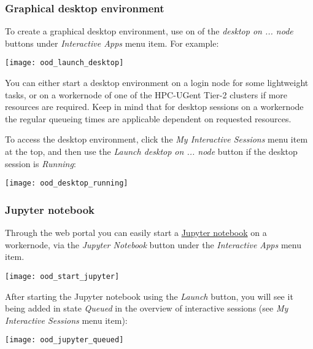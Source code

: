 \subsubsection{Graphical desktop environment}

To create a graphical desktop environment, use on of the \emph{desktop on ... node} buttons under \emph{Interactive Apps} menu item. For example:

\begin{center}
    \texttt{[image: ood\_launch\_desktop]}
\end{center}

You can either start a desktop environment on a login node
for some lightweight tasks, or on a workernode of one of the HPC-UGent Tier-2 clusters if
more resources are required.
Keep in mind that for desktop sessions on a workernode 
the regular queueing times are applicable dependent on requested resources.


To access the desktop environment, click the \emph{My Interactive Sessions} menu item at the top,
and then use the \emph{Launch desktop on ... node} button if the desktop session is \emph{Running}:

\begin{center}
    \texttt{[image: ood\_desktop\_running]}
\end{center}

\subsubsection{Jupyter notebook}

Through the web portal you can easily start a \href{https://jupyter.org/}{Jupyter notebook}
on a workernode, via the \emph{Jupyter Notebook} button under the \emph{Interactive Apps} menu item.

\begin{center}
    \texttt{[image: ood\_start\_jupyter]}
\end{center}

After starting the Jupyter notebook using the \emph{Launch} button,
you will see it being added in state \emph{Queued} in the overview of interactive sessions
(see \emph{My Interactive Sessions} menu item):


\begin{center}
    \texttt{[image: ood\_jupyter\_queued]}
\end{center}

